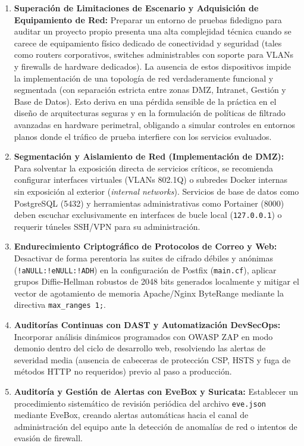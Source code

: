 \begin{enumerate}
  \item \textbf{Superación de Limitaciones de Escenario y Adquisición de Equipamiento de Red:} Preparar un entorno de pruebas fidedigno para auditar un proyecto propio presenta una alta complejidad técnica cuando se carece de equipamiento físico dedicado de conectividad y seguridad (tales como routers corporativos, switches administrables con soporte para VLANs y firewalls de hardware dedicados). La ausencia de estos dispositivos impide la implementación de una topología de red verdaderamente funcional y segmentada (con separación estricta entre zonas DMZ, Intranet, Gestión y Base de Datos). Esto deriva en una pérdida sensible de la práctica en el diseño de arquitecturas seguras y en la formulación de políticas de filtrado avanzadas en hardware perimetral, obligando a simular controles en entornos planos donde el tráfico de prueba interfiere con los servicios evaluados.
  
  \item \textbf{Segmentación y Aislamiento de Red (Implementación de DMZ):} Para solventar la exposición directa de servicios críticos, se recomienda configurar interfaces virtuales (VLANs 802.1Q) o subredes Docker internas sin exposición al exterior (\textit{internal networks}). Servicios de base de datos como PostgreSQL (5432) y herramientas administrativas como Portainer (8000) deben escuchar exclusivamente en interfaces de bucle local (\texttt{127.0.0.1}) o requerir túneles SSH/VPN para su administración.

  \item \textbf{Endurecimiento Criptográfico de Protocolos de Correo y Web:} Desactivar de forma perentoria las suites de cifrado débiles y anónimas (\texttt{!aNULL:!eNULL:!ADH}) en la configuración de Postfix (\texttt{main.cf}), aplicar grupos Diffie-Hellman robustos de 2048 bits generados localmente y mitigar el vector de agotamiento de memoria Apache/Nginx ByteRange mediante la directiva \texttt{max\_ranges 1;}.

  \item \textbf{Auditorías Continuas con DAST y Automatización DevSecOps:} Incorporar análisis dinámicos programados con OWASP ZAP en modo demonio dentro del ciclo de desarrollo web, resolviendo las alertas de severidad media (ausencia de cabeceras de protección CSP, HSTS y fuga de métodos HTTP no requeridos) previo al paso a producción.

  \item \textbf{Auditoría y Gestión de Alertas con EveBox y Suricata:} Establecer un procedimiento sistemático de revisión periódica del archivo \texttt{eve.json} mediante EveBox, creando alertas automáticas hacia el canal de administración del equipo ante la detección de anomalías de red o intentos de evasión de firewall.


\end{enumerate}
